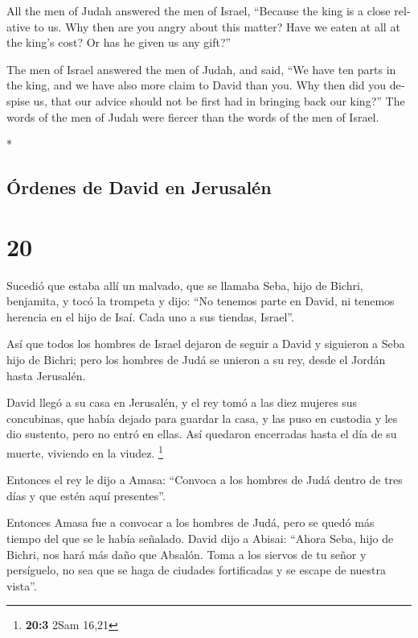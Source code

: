 \begin{paracol}{2}
\begin{otherlanguage}{english}
 All the men of Judah answered the men of Israel,
``Because the king is a close relative to us. Why then are you angry
about this matter? Have we eaten at all at the king's cost? Or has he
given us any gift?''

 The men of Israel answered the men of Judah, and said,
``We have ten parts in the king, and we have also more claim to David
than you. Why then did you despise us, that our advice should not be
first had in bringing back our king?'' The words of the men of Judah
were fiercer than the words of the men of Israel.

\end{otherlanguage}

\switchcolumn[0]*

\hypertarget{uxf3rdenes-de-david-en-jerusaluxe9n}{%
\subsection{Órdenes de David en
Jerusalén}\label{uxf3rdenes-de-david-en-jerusaluxe9n}}

\hypertarget{section-38}{%
\section{20}\label{section-38}}

 Sucedió que estaba allí un malvado, que se llamaba Seba,
hijo de Bichri, benjamita, y tocó la trompeta y dijo: ``No tenemos parte
en David, ni tenemos herencia en el hijo de Isaí. Cada uno a sus
tiendas, Israel''.

 Así que todos los hombres de Israel dejaron de seguir a
David y siguieron a Seba hijo de Bichri; pero los hombres de Judá se
unieron a su rey, desde el Jordán hasta Jerusalén.

 David llegó a su casa en Jerusalén, y el rey tomó a las
diez mujeres sus concubinas, que había dejado para guardar la casa, y
las puso en custodia y les dio sustento, pero no entró en ellas. Así
quedaron encerradas hasta el día de su muerte, viviendo en la viudez.
\footnote{\textbf{20:3} 2Sam 16,21}

 Entonces el rey le dijo a Amasa: ``Convoca a los hombres
de Judá dentro de tres días y que estén aquí presentes''.

 Entonces Amasa fue a convocar a los hombres de Judá, pero
se quedó más tiempo del que se le había señalado.  David
dijo a Abisai: ``Ahora Seba, hijo de Bichri, nos hará más daño que
Absalón. Toma a los siervos de tu señor y persíguelo, no sea que se haga
de ciudades fortificadas y se escape de nuestra vista''.


\end{paracol}
